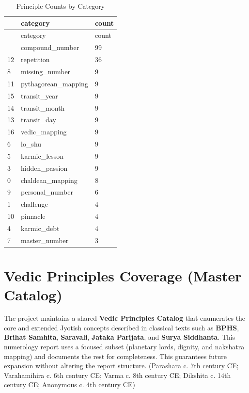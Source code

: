 \documentclass[
  11pt,
  a4paper,
  oneside,
  openany]{report}
\begin{document}
\label{num-catalog-counts}
\begin{longtable}[]{@{}lll@{}}
\caption{Principle Counts by Category}\tabularnewline
\toprule\noalign{}
& category & count \\
\midrule\noalign{}
\endfirsthead
\toprule\noalign{}
& category & count \\
\midrule\noalign{}
\endhead
\bottomrule\noalign{}
\endlastfoot
2 & compound\_number & 99 \\
12 & repetition & 36 \\
8 & missing\_number & 9 \\
11 & pythagorean\_mapping & 9 \\
15 & transit\_year & 9 \\
14 & transit\_month & 9 \\
13 & transit\_day & 9 \\
16 & vedic\_mapping & 9 \\
6 & lo\_shu & 9 \\
5 & karmic\_lesson & 9 \\
3 & hidden\_passion & 9 \\
0 & chaldean\_mapping & 8 \\
9 & personal\_number & 6 \\
1 & challenge & 4 \\
10 & pinnacle & 4 \\
4 & karmic\_debt & 4 \\
7 & master\_number & 3 \\
\end{longtable}

\chapter{Vedic Principles Coverage (Master
Catalog)}\label{vedic-principles-coverage-master-catalog}

The project maintains a shared \textbf{Vedic Principles Catalog} that
enumerates the core and extended Jyotish concepts described in classical
texts such as \textbf{BPHS}, \textbf{Brihat Samhita}, \textbf{Saravali},
\textbf{Jataka Parijata}, and \textbf{Surya Siddhanta}. This numerology
report uses a focused subset (planetary lords, dignity, and nakshatra
mapping) and documents the rest for completeness. This guarantees future
expansion without altering the report structure. (Parashara c. 7th
century CE; Varahamihira c. 6th century CE; Varma c. 8th century CE;
Dikshita c. 14th century CE; Anonymous c. 4th century CE)
\end{document}

